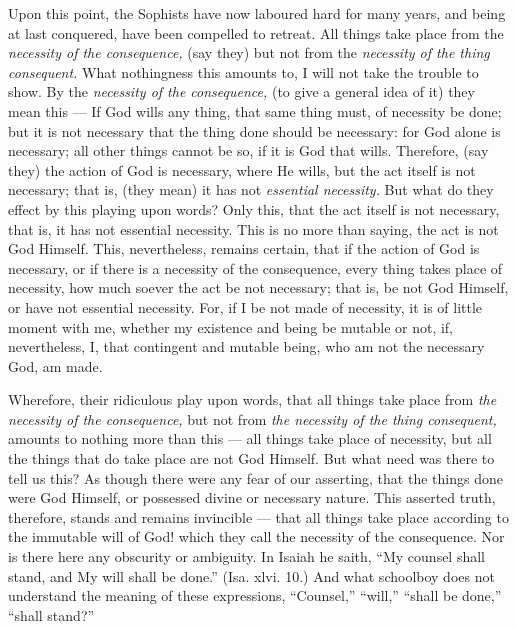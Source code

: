 Upon this point, the Sophists have now laboured hard for many years, and being at last conquered, have been compelled to retreat. All things take place from the \emph{necessity of the consequence, }(say they) but not from the \emph{necessity of the thing consequent. }What nothingness this amounts to, I will not take the trouble to show. By the \emph{necessity of the consequence, }(to give a general idea of it) they mean this — If God wills any thing, that same thing must, of necessity be done; but it is not necessary that the thing done should be necessary: for God alone is necessary; all other things cannot be so, if it is God that wills. Therefore, (say they) the action of God is necessary, where He wills, but the act itself is not necessary; that is, (they mean) it has not \emph{essential necessity. }But what do they effect by this playing upon words? Only this, that the act itself is not necessary, that is, it has not essential necessity. This is no more than saying, the act is not God Himself. This, nevertheless, remains certain, that if the action of God is necessary, or if there is a necessity of the consequence, every thing takes place of necessity, how much soever the act be not necessary; that is, be not God Himself, or have not essential necessity. For, if I be not made of necessity, it is of little moment with me, whether my existence and being be mutable or not, if, nevertheless, I, that contingent and mutable being, who am not the necessary God, am made.

Wherefore, their ridiculous play upon words, that all things take place from \emph{the necessity of the consequence, }but not from \emph{the necessity of the thing consequent, }amounts to nothing more than this — all things take place of necessity, but all the things that do take place are not God Himself. But what need was there to tell us this? As though there were any fear of our asserting, that the things done were God Himself, or possessed divine or necessary nature. This asserted truth, therefore, stands and remains invincible — that all things take place according to the immutable will of God! which they call the necessity of the consequence. Nor is there here any obscurity or ambiguity. In Isaiah he saith, “My counsel shall stand, and My will shall be done.” (Isa. xlvi. 10.) And what schoolboy does not understand the meaning of these expressions, “Counsel,” “will,” “shall be done,” “shall stand?”


